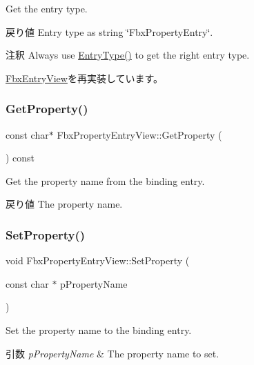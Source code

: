 Get the entry type. \begin{DoxyReturn}{戻り値}
Entry type as string \char`\"{}\+Fbx\+Property\+Entry\char`\"{}. 
\end{DoxyReturn}
\begin{DoxyRemark}{注釈}
Always use \hyperlink{class_fbx_property_entry_view_a36affcd0bce8be2a4b5f94ccd60fa462}{Entry\+Type()} to get the right entry type. 
\end{DoxyRemark}


\hyperlink{class_fbx_entry_view_a83ee50482b441ba8b0e6d7c2dba5432f}{Fbx\+Entry\+View}を再実装しています。

\mbox{\label{class_fbx_property_entry_view_a22f4b61845256d48885dc873c7341edc}} 
\subsubsection{\texorpdfstring{Get\+Property()}{GetProperty()}}
{\footnotesize\ttfamily const char$\ast$ Fbx\+Property\+Entry\+View\+::\+Get\+Property (\begin{DoxyParamCaption}{ }\end{DoxyParamCaption}) const}

Get the property name from the binding entry. \begin{DoxyReturn}{戻り値}
The property name. 
\end{DoxyReturn}
\mbox{\label{class_fbx_property_entry_view_adcf0a92938e634f1bcedaaf31281de61}} 
\subsubsection{\texorpdfstring{Set\+Property()}{SetProperty()}}
{\footnotesize\ttfamily void Fbx\+Property\+Entry\+View\+::\+Set\+Property (\begin{DoxyParamCaption}\item[{const char $\ast$}]{p\+Property\+Name }\end{DoxyParamCaption})}

Set the property name to the binding entry. 
\begin{DoxyParams}{引数}
{\em p\+Property\+Name} & The property name to set. \\
\hline
\end{DoxyParams}



